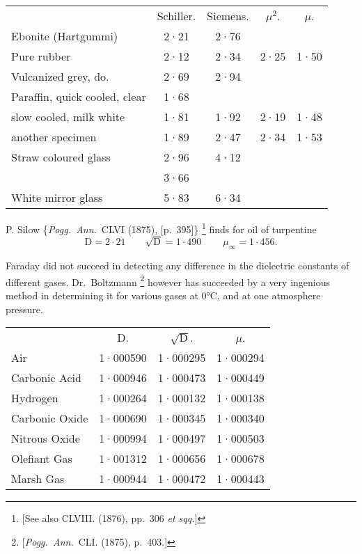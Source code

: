 \documentclass[12pt,oneside]{book}[2021/10/04]
\let\oldfootnote\footnote
\renewcommand\footnote[1]{%
\oldfootnote{\hspace{0.14em}#1}}
\newcommand{\lowditto}[1]{\makebox[\widthof{#1}][c]{„}}
\newcommand{\¬}{\hphantom{0}}
\begin{document}
\newcommand{\dittoparaf}{\lowditto{Paraffin, }}
\begin{center}
\footnotesize
\begin{tabular}{lcccc}
& Schiller. & Siemens. & \(\mu^2\). & \(\mu\).\\
Ebonite (Hartgummi)            & 2·21 & 2·76 & &\\
Pure rubber                    & 2·12 & 2·34 & 2·25 & 1·50\\
Vulcanized grey, do.           & 2·69 & 2·94 & &\\
Paraffin, quick cooled, clear  & 1·68 & & &\\
\dittoparaf slow cooled, milk white & 1·81 & 1·92 & 2·19 & 1·48\\
\dittoparaf another specimen & 1·89 & 2·47 & 2·34 & 1·53\\
Straw coloured glass           & 2·96 & 4·12 & &\\
\lowditto{Straw }\lowditto{coloured glass} & 3·66 & & &\\
White mirror glass             & 5·83 & 6·34 & &
\end{tabular}
\end{center}

P. Silow \{\textit{Pogg.\ Ann.}\ CLVI (1875), [p.\ 395]\}\footnote{
[See also CLVIII. (1876), pp.\ 306 \textit{et sqq.}]} finds for oil of
turpentine
{\footnotesize\[
\mathrm D = 2·21 \qquad \sqrt {\mathrm D} = 1·490  \qquad\ \mu _\infty = 1·456\text{.}
\]}

Faraday did not succeed in detecting any difference in the
dielectric constants of different gases. Dr.\ Boltzmann\footnote{
[\textit{Pogg.\ Ann.}\ CLI. (1875), p.\ 403.]} however
has succeeded by a very ingenious method in determining it for
various gases at 0°C, and at one atmosphere pressure.

\begin{center}
\footnotesize
\begin{tabular}{lccc}
& \(\mathrm D\). & \(\sqrt{\mathrm D}\). & \(\mu\).\\
Air             & 1·000590 & 1·000295 & 1·000294\\
Carbonic Acid   & 1·000946 & 1·000473 & 1·000449\\
Hydrogen        & 1·000264 & 1·000132 & 1·000138\\
Carbonic Oxide  & 1·000690 & 1·000345 & 1·000340\\
Nitrous Oxide   & 1·000994 & 1·000497 & 1·000503\\
Olefiant Gas    & 1·001312 & 1·000656 & 1·000678\\
Marsh Gas       & 1·000944 & 1·000472 & 1·000443
\end{tabular}
\end{center}
\end{document}
